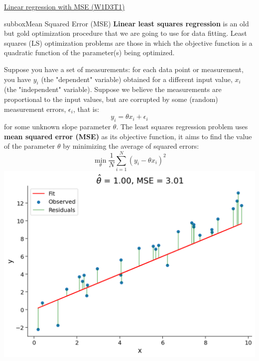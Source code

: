 \begin{textbox}{\href{https://compneuro.neuromatch.io/tutorials/W1D3_ModelFitting/chapter_title.html}{Linear regression with MSE (W1D3T1)}}
\begin{subbox}{subbox}{Mean Squared Error (MSE)}
\scriptsize
\textbf{Linear least squares regression} is an old but gold  optimization procedure that we are going to use for data fitting. Least squares (LS) optimization problems are those in which the objective function is a quadratic function of the
parameter(s) being optimized.

Suppose you have a set of measurements: for each data point or measurement, you have $y_{i}$ (the "dependent" variable) obtained for a different input value, $x_{i}$ (the "independent" variable).  Suppose we believe the measurements are proportional to the input values, but are corrupted by some (random) measurement errors, $\epsilon_{i}$, that is:
\begin{equation}
y_{i}= \theta x_{i}+\epsilon_{i}
\end{equation}
for some unknown slope parameter $\theta.$ The least squares regression problem uses \textbf{mean squared error (MSE)} as its objective function, it aims to find the value of the parameter $\theta$ by minimizing the average of squared errors:
\begin{equation}
\min _{\theta} \frac{1}{N}\sum_{i=1}^{N}\left(y_{i}-\theta x_{i}\right)^{2}
\end{equation}
\centering
\includegraphics[scale=0.2]{Figures/ModelFitting/MFFigure1.png}
\end{subbox}

\end{textbox}
